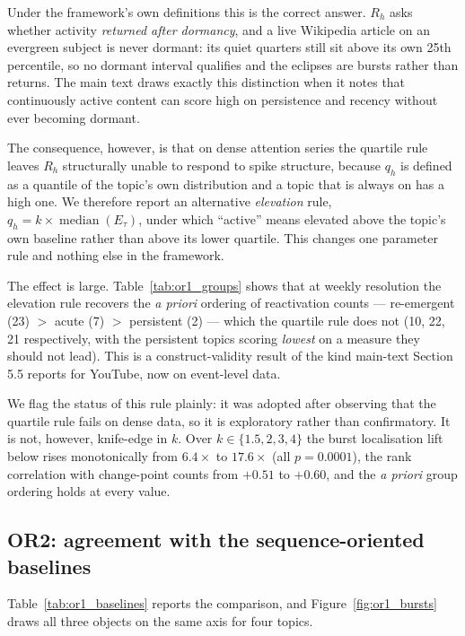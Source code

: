 \documentclass[11pt]{article}
\begin{document}
Under the framework's own definitions this is the correct answer. $R_h$ asks
whether activity \emph{returned after dormancy}, and a live Wikipedia article on
an evergreen subject is never dormant: its quiet quarters still sit above its own
25th percentile, so no dormant interval qualifies and the eclipses are bursts
rather than returns. The main text draws exactly this distinction when it notes
that continuously active content can score high on persistence and recency
without ever becoming dormant.

The consequence, however, is that on dense attention series the quartile rule
leaves $R_h$ structurally unable to respond to spike structure, because $q_h$ is
defined as a quantile of the topic's own distribution and a topic that is always
on has a high one. We therefore report an alternative \emph{elevation} rule,
$q_h = k \times \operatorname{median}(E_\tau)$, under which ``active'' means
elevated above the topic's own baseline rather than above its lower quartile.
This changes one parameter rule and nothing else in the framework.

The effect is large. Table~\ref{tab:or1_groups} shows that at weekly resolution
the elevation rule recovers the \emph{a priori} ordering of reactivation counts
--- re-emergent (23) $>$ acute (7) $>$ persistent (2) --- which the quartile rule
does not (10, 22, 21 respectively, with the persistent topics scoring
\emph{lowest} on a measure they should not lead). This is a construct-validity
result of the kind main-text Section 5.5 reports for YouTube, now on event-level
data.

We flag the status of this rule plainly: it was adopted after observing that the
quartile rule fails on dense data, so it is exploratory rather than confirmatory.
It is not, however, knife-edge in $k$. Over $k \in \{1.5, 2, 3, 4\}$ the burst
localisation lift below rises monotonically from $6.4\times$ to $17.6\times$
(all $p = 0.0001$), the rank correlation with change-point counts from $+0.51$ to
$+0.60$, and the \emph{a priori} group ordering holds at every value.

\subsection{OR2: agreement with the sequence-oriented baselines}
\label{sec:or1_or2}

Table~\ref{tab:or1_baselines} reports the comparison, and
Figure~\ref{fig:or1_bursts} draws all three objects on the same axis for four
topics.
\end{document}
